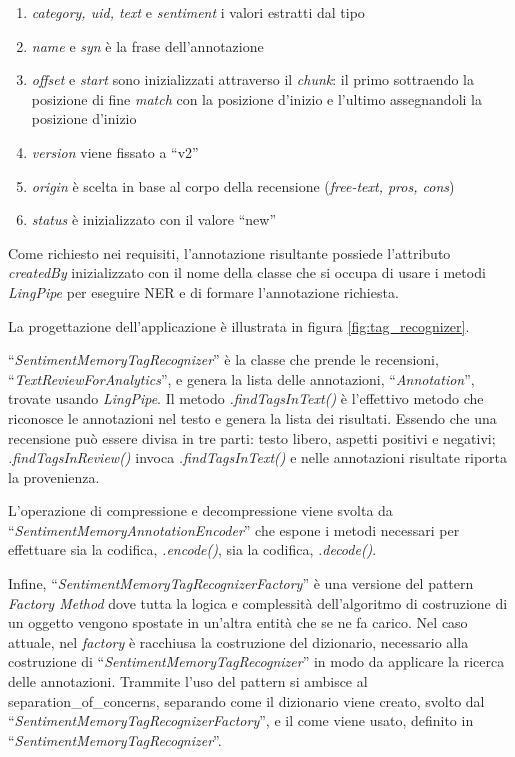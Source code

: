 \begin{enumerate}
\item \textit{category, uid, text} e \textit{sentiment} i valori estratti dal
tipo
\item \textit{name} e \textit{syn} è la frase dell'annotazione
\item \textit{offset} e \textit{start} sono inizializzati attraverso il
\textit{chunk}: il primo sottraendo la posizione di fine \textit{match} con la
posizione d'inizio e l'ultimo assegnandoli la posizione d'inizio
\item \textit{version} viene fissato a ``v2''
\item \textit{origin} è scelta in base al corpo della recensione
(\textit{free-text, pros, cons})
\item \textit{status} è inizializzato con il valore ``new''
\end{enumerate}

Come richiesto nei requisiti, l'annotazione risultante possiede l'attributo
\textit{createdBy} inizializzato con il nome della classe che si occupa di
usare i metodi \textit{LingPipe} per eseguire \gls{NER} e di formare
l'annotazione richiesta.

La progettazione dell'applicazione è illustrata in figura
\ref{fig:tag_recognizer}.

``\textit{SentimentMemoryTagRecognizer}'' è la classe che prende le recensioni,
``\textit{TextReviewForAnalytics}'', e genera la lista delle annotazioni,
``\textit{Annotation}'', trovate usando \textit{LingPipe}. Il metodo
\textit{.findTagsInText()} è l'effettivo metodo che riconosce le annotazioni nel
testo e genera la lista dei risultati. Essendo che una recensione può essere
divisa in tre parti: testo libero, aspetti positivi e negativi;
\textit{.findTagsInReview()} invoca \textit{.findTagsInText()} e nelle
annotazioni risultate riporta la provenienza.

L'operazione di compressione e decompressione viene svolta da
``\textit{SentimentMemoryAnnotationEncoder}'' che espone i metodi necessari per
effettuare sia la codifica, \textit{.encode()}, sia la codifica,
\textit{.decode()}.

Infine, ``\textit{SentimentMemoryTagRecognizerFactory}'' è una versione del
pattern \textit{Factory Method} dove tutta la logica e complessità
dell'algoritmo di costruzione di un oggetto vengono spostate in un'altra entità
che se ne fa carico. Nel caso attuale, nel \textit{factory} è racchiusa la
costruzione del dizionario, necessario alla costruzione di
``\textit{SentimentMemoryTagRecognizer}'' in modo da applicare la ricerca delle
annotazioni. Trammite l'uso del pattern si ambisce al
\gls{separation_of_concerns}, separando come il dizionario viene creato, svolto
dal ``\textit{SentimentMemoryTagRecognizerFactory}'', e il come viene usato,
definito in ``\textit{SentimentMemoryTagRecognizer}''.

